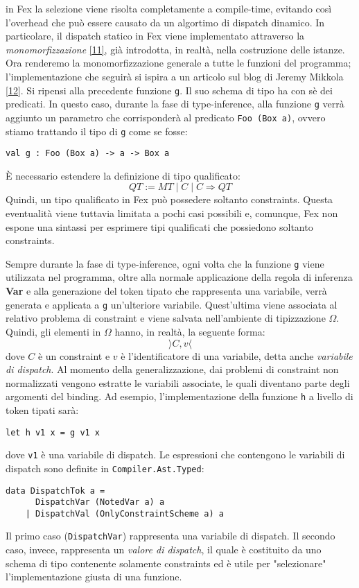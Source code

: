\documentclass[10pt,a4paper]{article}
\begin{document}
in Fex la selezione viene risolta completamente a compile-time, evitando così l'overhead che può essere causato
da un algortimo di dispatch dinamico. In particolare, il dispatch statico in Fex viene implementato attraverso
la \textit{monomorfizzazione} \hyperlink{bibl11}{[11]}, già introdotta, in realtà, nella costruzione delle istanze.
Ora renderemo la
monomorfizzazione generale a tutte le funzioni del programma; l'implementazione che seguirà si ispira a un articolo
sul blog di Jeremy Mikkola \hyperlink{bibl12}{[12]}. Si ripensi alla precedente funzione \texttt{g}. Il suo
schema di tipo ha con sè dei predicati. In questo caso, durante la fase di type-inference, alla funzione \texttt{g}
verrà aggiunto un parametro che corrisponderà al predicato \texttt{Foo (Box a)}, ovvero stiamo trattando il tipo di
\texttt{g} come se fosse:
\begin{lstlisting}
val g : Foo (Box a) -> a -> Box a
\end{lstlisting}
\`E necessario estendere la definizione di tipo qualificato:
\[ QT := MT \; | \; C \; | \; C \Rightarrow QT \]
Quindi, un tipo qualificato in Fex può possedere soltanto constraints. Questa eventualità viene tuttavia limitata
a pochi casi possibili e, comunque, Fex non espone una sintassi per esprimere tipi qualificati che possiedono
soltanto constraints.

Sempre durante la fase di type-inference, ogni volta che la funzione \texttt{g} viene utilizzata nel programma, oltre
alla normale applicazione della regola di inferenza \textbf{Var} e alla generazione del token tipato che rappresenta
una variabile, verrà generata e applicata a \texttt{g} un'ulteriore variabile. Quest'ultima viene associata al
relativo problema di constraint e viene salvata nell'ambiente di tipizzazione $ \Omega $. Quindi, gli elementi in
$ \Omega $ hanno, in realtà, la seguente forma:
\[ \rangle C, v \langle \]
dove $ C $ è un constraint e $ v $ è l'identificatore di una variabile, detta anche \textit{variabile di dispatch}.
Al momento della generalizzazione,
dai problemi di constraint non normalizzati vengono estratte le variabili associate, le quali diventano parte degli
argomenti del binding. Ad esempio, l'implementazione della funzione \texttt{h} a livello di token tipati sarà:
\begin{lstlisting}
let h v1 x = g v1 x
\end{lstlisting}
dove \texttt{v1} è una variabile di dispatch. Le espressioni
che contengono le variabili di dispatch sono definite in \texttt{Compiler.Ast.Typed}:
\begin{lstlisting}
data DispatchTok a =
      DispatchVar (NotedVar a) a
    | DispatchVal (OnlyConstraintScheme a) a
\end{lstlisting}
Il primo caso (\texttt{DispatchVar}) rappresenta una variabile di dispatch. Il secondo caso, invece, rappresenta un
\textit{valore di dispatch}, il quale è costituito da uno schema di tipo contenente solamente constraints ed è utile
per "selezionare" l'implementazione giusta di una funzione.
\end{document}
